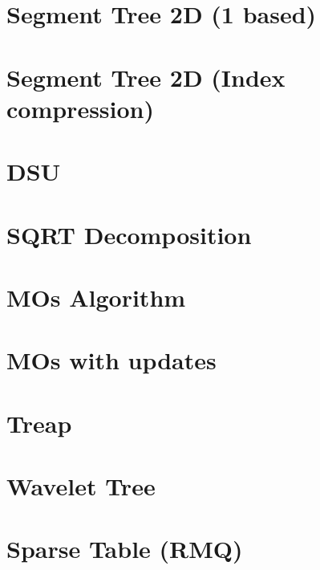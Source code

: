 \section{Segment Tree 2D (1 based)}


\section{Segment Tree 2D (Index compression)}


\section{DSU}


\section{SQRT Decomposition}


\section{MOs Algorithm}


\section{MOs with updates}


\section{Treap}


\section{Wavelet Tree}


\section{Sparse Table (RMQ)}


